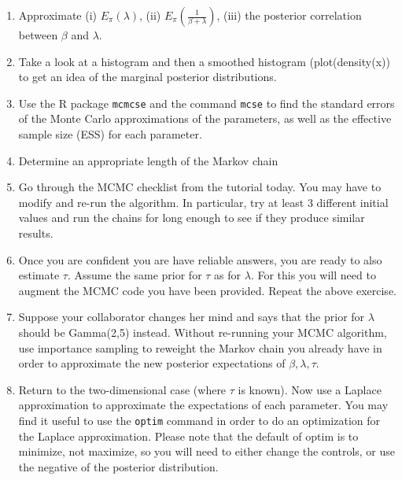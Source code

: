 \documentclass[12pt]{article}
\theoremstyle{example}
\theoremstyle{remark}
\theoremstyle{lemma}
\theoremstyle{definition}
\theoremstyle{corol}
\theoremstyle{proposition}
\theoremstyle{condition}
\begin{document}
\begin{enumerate}
\item Approximate (i) $E_{\pi}(\lambda)$, (ii)
  $E_{\pi}\left(\frac{1}{\beta + \lambda}\right)$, (iii) the posterior
  correlation between $\beta$ and $\lambda$.
\item Take a look at a histogram and then a smoothed histogram
  (plot(density(x)) to get an idea of the marginal posterior distributions.
\item Use the R package {\tt mcmcse} and the command {\tt mcse} to
  find the standard errors of the Monte Carlo approximations of
  the parameters, as well as the effective sample size (ESS) for each parameter.
\item Determine an appropriate length of the Markov chain 
\item Go through the MCMC checklist from the tutorial today. You may
  have to modify and re-run the algorithm. In particular, try at least
  3 different initial values and run the chains for long enough to see
  if they produce similar results. 
\item Once you are confident you are have reliable answers, you are
  ready to also estimate $\tau$. Assume the same prior for $\tau$ as
  for $\lambda.$ For this you will need to augment the
  MCMC code you have been provided. Repeat the above exercise.
\item Suppose your collaborator changes her mind and says that the
  prior for $\lambda$ should be Gamma(2,5) instead. Without re-running
  your MCMC algorithm, use importance sampling to reweight the Markov
  chain you already have in order to approximate the new posterior
  expectations of $\beta, \lambda,\tau$.
\item Return to the two-dimensional case (where $\tau$ is known). Now
  use a Laplace approximation to approximate the expectations of each
  parameter. You may find it useful to use the {\tt optim} command in
  order to do an optimization for the Laplace approximation. Please
  note that the default of optim is to minimize, not maximize, so you
  will need to either change the controls, or use the negative of the 
  posterior distribution.
\end{enumerate}
\end{document}
